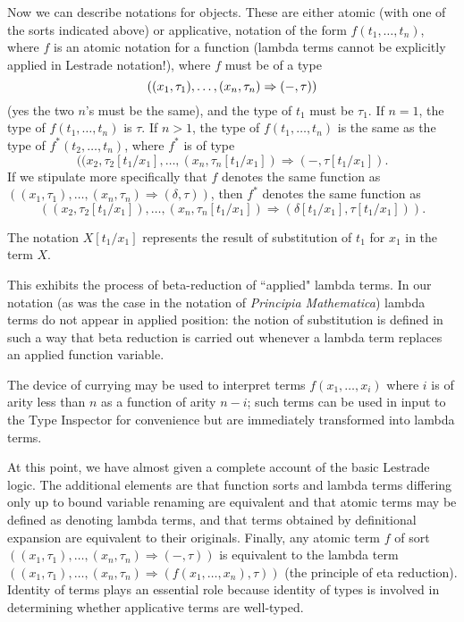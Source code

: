 \documentclass[12pt]{article}
\begin{document}
Now we can describe notations for objects.  These are either atomic (with one of the sorts indicated above) or applicative,
notation of the form $f(t_1,\ldots,t_n)$, where $f$ is an atomic notation for a function (lambda terms cannot be explicitly applied in Lestrade notation!), where
$f$ must be of a type $${\mbox((x_1,\tau_1),\ldots,(x_n,\tau_n) \Rightarrow (-,\tau))}$$ (yes the two $n$'s must be the same), and the type of $t_1$ must be $\tau_1$.  If $n=1$,
the type of $f(t_1,\ldots,t_n)$ is $\tau$.  If $n>1$, the type of $f(t_1,\ldots,t_n)$ is the same as the type of $f^*(t_2,\ldots,t_n)$, where
$f^*$ is of type $$((x_2,\tau_2[t_1/x_1],\ldots,(x_n,\tau_n[t_1/x_1]) \Rightarrow (-,\tau[t_1/x_1]).$$ If we stipulate more specifically that
$f$ denotes the same function as $((x_1,\tau_1),\ldots,(x_n,\tau_n) \Rightarrow (\delta,\tau))$, then $f^*$ denotes the same function as $$((x_2,\tau_2[t_1/x_1]),\ldots,(x_n,\tau_n[t_1/x_1]) \Rightarrow (\delta[t_1/x_1],\tau[t_1/x_1])).$$  

The notation $X[t_1/x_1]$ represents the result of substitution of $t_1$ for $x_1$ in the term $X$.

This exhibits the process of beta-reduction of ``applied" lambda terms.  In our notation (as was the case in the notation of {\em Principia Mathematica\/}) lambda terms do not appear in applied position:  the notion of substitution is defined in such a way that beta reduction is carried out whenever a lambda term replaces an applied function variable.

The device of currying may be used to interpret terms $f(x_1,\ldots,x_i)$ where $i$ is of arity less than $n$ as a function of arity $n-i$;  such terms can be used  in input to the Type Inspector for convenience but are immediately transformed into lambda terms.

At this point, we have almost given a complete account of the basic Lestrade logic.  The additional elements are that function sorts and lambda terms differing only up to bound variable renaming are equivalent and that atomic terms may be defined as denoting lambda terms, and that terms obtained by definitional expansion are equivalent to their originals.  Finally, any atomic term $f$ of sort $((x_1,\tau_1),\ldots,(x_n,\tau_n) \Rightarrow (-,\tau))$ is equivalent to
the lambda term $((x_1,\tau_1),\ldots,(x_n,\tau_n) \Rightarrow (f(x_1,\ldots,x_n),\tau))$ (the principle of eta reduction).  Identity of terms plays an essential role because identity of types is involved in determining whether applicative terms are well-typed.
\end{document}
